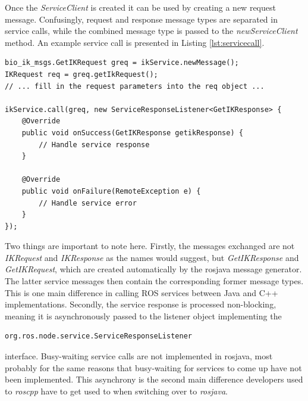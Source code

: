 Once the \textit{ServiceClient} is created it can be used by creating a new request message. Confusingly, request and response message types are separated in service calls, while the combined message type is passed to the \textit{newServiceClient} method. An example service call is presented in Listing \ref{lst:servicecall}.

\begin{lstlisting}[caption={An example rosjava service call}, label=lst:servicecall]
bio_ik_msgs.GetIKRequest greq = ikService.newMessage();
IKRequest req = greq.getIkRequest();
// ... fill in the request parameters into the req object ...

ikService.call(greq, new ServiceResponseListener<GetIKResponse> {
	@Override
	public void onSuccess(GetIKResponse getikResponse) {
		// Handle service response
	}
	
	@Override
	public void onFailure(RemoteException e) {
		// Handle service error
	}
});
\end{lstlisting}

Two things are important to note here. Firstly, the messages exchanged are not \textit{IKRequest} and \textit{IKResponse} as the names would suggest, but \textit{GetIKResponse} and \textit{GetIKRequest}, which are created automatically by the rosjava message generator. The latter service messages then contain the corresponding former message types. This is one main difference in calling ROS services between Java and C++ implementations. Secondly, the service response is processed non-blocking, meaning it is asynchronously passed to the listener object implementing  the 
\begin{lstlisting}[numbers=none]
org.ros.node.service.ServiceResponseListener
\end{lstlisting}
interface. Busy-waiting service calls are not implemented in rosjava, most probably for the same reasons that busy-waiting for services to come up have not been implemented. This asynchrony is the second main difference developers used to \textit{roscpp} have to get used to when switching over to \textit{rosjava}.

